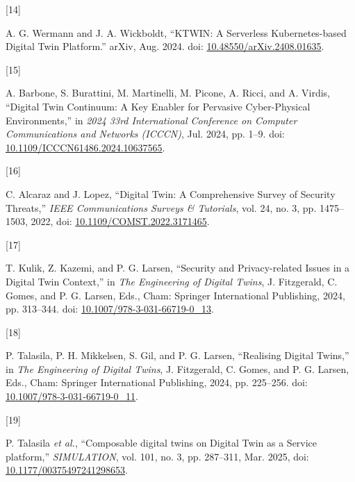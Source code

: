\documentclass[
  12pt,
  a4paper,
]{article}
\newlength{\cslhangindent}
\newlength{\csllabelwidth}
\newenvironment{CSLReferences}[2] %
 {\begin{list}{}{%
  \setlength{\itemindent}{0pt}
  \setlength{\leftmargin}{0pt}
  \setlength{\parsep}{0pt}
  \ifodd #1
   \setlength{\leftmargin}{\cslhangindent}
   \setlength{\itemindent}{-1\cslhangindent}
  \fi
  \setlength{\itemsep}{#2\baselineskip}}}
 {\end{list}}
\newcommand{\CSLLeftMargin}[1]{\parbox[t]{\csllabelwidth}{\strut#1\strut}}
\newcommand{\CSLRightInline}[1]{\parbox[t]{\linewidth - \csllabelwidth}{\strut#1\strut}}
\begin{document}
\begin{CSLReferences}{0}{0}
\CSLLeftMargin{{[}14{]} }%
\CSLRightInline{A. G. Wermann and J. A. Wickboldt, {``{KTWIN}: {A}
{Serverless} {Kubernetes}-based {Digital} {Twin} {Platform}.''} arXiv,
Aug. 2024. doi:
\href{https://doi.org/10.48550/arXiv.2408.01635}{10.48550/arXiv.2408.01635}.}

\CSLLeftMargin{{[}15{]} }%
\CSLRightInline{A. Barbone, S. Burattini, M. Martinelli, M. Picone, A.
Ricci, and A. Virdis, {``Digital {Twin} {Continuum}: A {Key} {Enabler}
for {Pervasive} {Cyber}-{Physical} {Environments},''} in \emph{2024 33rd
{International} {Conference} on {Computer} {Communications} and
{Networks} ({ICCCN})}, Jul. 2024, pp. 1--9. doi:
\href{https://doi.org/10.1109/ICCCN61486.2024.10637565}{10.1109/ICCCN61486.2024.10637565}.}

\CSLLeftMargin{{[}16{]} }%
\CSLRightInline{C. Alcaraz and J. Lopez, {``Digital {Twin}: {A}
{Comprehensive} {Survey} of {Security} {Threats},''} \emph{IEEE
Communications Surveys \& Tutorials}, vol. 24, no. 3, pp. 1475--1503,
2022, doi:
\href{https://doi.org/10.1109/COMST.2022.3171465}{10.1109/COMST.2022.3171465}.}

\CSLLeftMargin{{[}17{]} }%
\CSLRightInline{T. Kulik, Z. Kazemi, and P. G. Larsen, {``Security and
{Privacy}-related {Issues} in a {Digital} {Twin} {Context},''} in
\emph{The {Engineering} of {Digital} {Twins}}, J. Fitzgerald, C. Gomes,
and P. G. Larsen, Eds., Cham: Springer International Publishing, 2024,
pp. 313--344. doi:
\href{https://doi.org/10.1007/978-3-031-66719-0_13}{10.1007/978-3-031-66719-0\_13}.}

\CSLLeftMargin{{[}18{]} }%
\CSLRightInline{P. Talasila, P. H. Mikkelsen, S. Gil, and P. G. Larsen,
{``Realising {Digital} {Twins},''} in \emph{The {Engineering} of
{Digital} {Twins}}, J. Fitzgerald, C. Gomes, and P. G. Larsen, Eds.,
Cham: Springer International Publishing, 2024, pp. 225--256. doi:
\href{https://doi.org/10.1007/978-3-031-66719-0_11}{10.1007/978-3-031-66719-0\_11}.}

\CSLLeftMargin{{[}19{]} }%
\CSLRightInline{P. Talasila \emph{et al.}, {``Composable digital twins
on {Digital} {Twin} as a {Service} platform,''} \emph{SIMULATION}, vol.
101, no. 3, pp. 287--311, Mar. 2025, doi:
\href{https://doi.org/10.1177/00375497241298653}{10.1177/00375497241298653}.}


\end{CSLReferences}
\end{document}
